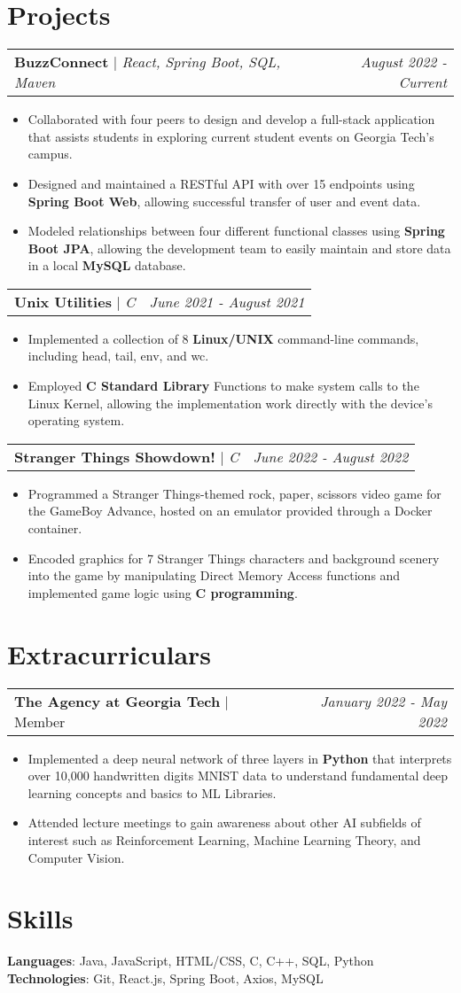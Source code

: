 \documentclass[letterpaper,11pt]{article}
\makeatletter
\newcommand{\resumeExperienceHeading}[3]{
    \begin{tabular*}{0.99\textwidth}[t]{l@{\extracolsep{\fill}}r}
      \textbf{#1} $\vert$ {#2} & \textit{#3} \\
    \end{tabular*}\vspace{-3pt}
}
\newcommand{\resumeProjectHeading}[3]{
    \begin{tabular*}{0.97\textwidth}[t]{l@{\extracolsep{\fill}}r}
      \textbf{#1} $\vert$ \textit{#2}  & \textit{#3}
    \end{tabular*}\vspace{-3pt}
}
\newcommand{\resumeItemListStart}{\begin{itemize}[noitemsep]\vspace{-4pt}}
\newcommand{\resumeItemListEnd}{\end{itemize}}
\makeatother
\begin{document}
\section{Projects}
    \resumeProjectHeading{BuzzConnect}{React, Spring Boot, SQL, Maven}{August 2022 - Current}
      \resumeItemListStart
        \item {Collaborated with four peers to design and develop a full-stack application that assists students in exploring current student events on Georgia Tech's campus.}
        \item {Designed and maintained a RESTful API with over 15 endpoints using \textbf{Spring Boot Web}, allowing successful transfer of user and event data.}
        \item {Modeled relationships between four different functional classes using \textbf{Spring Boot JPA}, allowing the development team to easily maintain and store data in a local \textbf{MySQL} database.}
      \resumeItemListEnd

    \resumeProjectHeading{Unix Utilities}{C}{June 2021 - August 2021}
      \resumeItemListStart
        \item {Implemented a collection of 8 \textbf{Linux/UNIX} command-line commands, including head, tail, env, and wc.}
        \item {Employed \textbf{C Standard Library} Functions to make system calls to the Linux Kernel, allowing the implementation work directly with the device's operating system.}
      \resumeItemListEnd

    \resumeProjectHeading{Stranger Things Showdown!}{C}{June 2022 - August 2022}
      \resumeItemListStart
        \item {Programmed a Stranger Things-themed rock, paper, scissors video game for the GameBoy Advance, hosted on an emulator provided through a Docker container.}
        \item {Encoded graphics for 7 Stranger Things characters and background scenery into the game by manipulating Direct Memory Access functions and implemented game logic using \textbf{C programming}.}
      \resumeItemListEnd

\section{Extracurriculars}
  \resumeExperienceHeading{The Agency at Georgia Tech}{Member}{January 2022 - May 2022}
    \resumeItemListStart
      \item {Implemented a deep neural network of three layers in \textbf{Python} that interprets over 10,000 handwritten
      digits MNIST data to understand fundamental deep learning concepts and basics to ML Libraries.}
      \item {Attended lecture meetings to gain awareness about other AI subfields of interest such as Reinforcement
      Learning, Machine Learning Theory, and Computer Vision.}
    \resumeItemListEnd
  
\section{Skills}
    \textbf{Languages}{: Java, JavaScript, HTML/CSS, C, C++, SQL, Python} \\
    \textbf{Technologies}{: Git, React.js, Spring Boot, Axios, MySQL}
\end{document}

